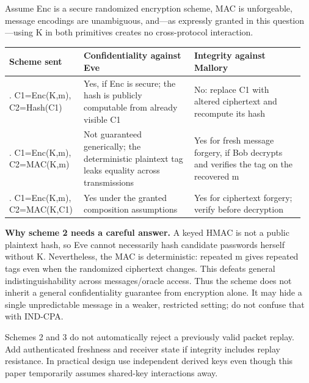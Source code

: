 \documentclass[11pt,a4paper]{article}
\begin{document}
Assume Enc is a secure randomized encryption scheme,\allowbreak{} MAC is unforgeable,\allowbreak{} message encodings are unambiguous,\allowbreak{} and—as expressly granted in this question—using K in both primitives creates no cross-protocol interaction.



{\small\setlength{\tabcolsep}{3pt}
\begin{longtable}{>{\raggedright\arraybackslash}p{0.23681\linewidth}>{\raggedright\arraybackslash}p{0.36081\linewidth}>{\raggedright\arraybackslash}p{0.36081\linewidth}}
\toprule
\textbf{Scheme sent} & \textbf{Confidentiality against Eve} & \textbf{Integrity against Mallory} \\
\midrule
\endhead
1. C1=\allowbreak{}Enc(K,\allowbreak{}m),\allowbreak{} C2=\allowbreak{}Hash(C1) & Yes,\allowbreak{} if Enc is secure; the hash is publicly computable from already visible C1 & No: replace C1 with altered ciphertext and recompute its hash \\
2. C1=\allowbreak{}Enc(K,\allowbreak{}m),\allowbreak{} C2=\allowbreak{}MAC(K,\allowbreak{}m) & Not guaranteed generically; the deterministic plaintext tag leaks equality across transmissions & Yes for fresh message forgery,\allowbreak{} if Bob decrypts and verifies the tag on the recovered m \\
3. C1=\allowbreak{}Enc(K,\allowbreak{}m),\allowbreak{} C2=\allowbreak{}MAC(K,\allowbreak{}C1) & Yes under the granted composition assumptions & Yes for ciphertext forgery; verify before decryption \\
\bottomrule
\end{longtable}
}

\textbf{Why scheme 2 needs a careful answer.} A keyed HMAC is not a public plaintext hash,\allowbreak{} so Eve cannot necessarily hash candidate passwords herself without K. Nevertheless,\allowbreak{} the MAC is deterministic: repeated m gives repeated tags even when the randomized ciphertext changes. This defeats general indistinguishability across messages/\allowbreak{}oracle access. Thus the scheme does not inherit a general confidentiality guarantee from encryption alone. It may hide a single unpredictable message in a weaker,\allowbreak{} restricted setting; do not confuse that with IND-CPA.


Schemes 2 and 3 do not automatically reject a previously valid packet replay. Add authenticated freshness and receiver state if integrity includes replay resistance. In practical design use independent derived keys even though this paper temporarily assumes shared-key interactions away.
\end{document}
